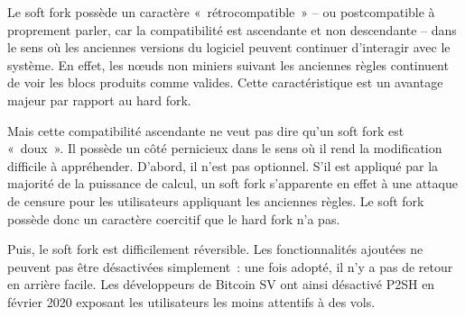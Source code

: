 
Le soft fork possède un caractère «~rétrocompatible~» -- ou postcompatible à proprement parler, car la compatibilité est ascendante et non descendante -- dans le sens où les anciennes versions du logiciel peuvent continuer d'interagir avec le système. En effet, les nœuds non miniers suivant les anciennes règles continuent de voir les blocs produits comme valides. Cette caractéristique est un avantage majeur par rapport au hard fork.


Mais cette compatibilité ascendante ne veut pas dire qu'un soft fork est «~doux~». Il possède un côté pernicieux dans le sens où il rend la modification difficile à appréhender. D'abord, il n'est pas optionnel. S'il est appliqué par la majorité de la puissance de calcul, un soft fork s'apparente en effet à une attaque de censure pour les utilisateurs appliquant les anciennes règles. Le soft fork possède donc un caractère coercitif que le hard fork n'a pas.

Puis, le soft fork est difficilement réversible. Les fonctionnalités ajoutées ne peuvent pas être désactivées simplement~: une fois adopté, il n'y a pas de retour en arrière facile. Les développeurs de Bitcoin SV ont ainsi désactivé P2SH en février 2020 exposant les utilisateurs les moins attentifs à des vols.

